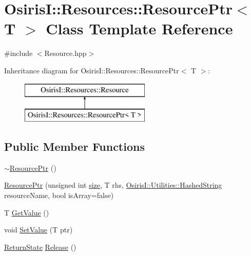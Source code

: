 \hypertarget{class_osiris_i_1_1_resources_1_1_resource_ptr}{\section{Osiris\-I\-:\-:Resources\-:\-:Resource\-Ptr$<$ T $>$ Class Template Reference}
\label{class_osiris_i_1_1_resources_1_1_resource_ptr}
}


{\ttfamily \#include $<$Resource.\-hpp$>$}

Inheritance diagram for Osiris\-I\-:\-:Resources\-:\-:Resource\-Ptr$<$ T $>$\-:\begin{figure}[H]
\begin{center}
\leavevmode
\includegraphics[height=2.000000cm]{class_osiris_i_1_1_resources_1_1_resource_ptr}
\end{center}
\end{figure}
\subsection*{Public Member Functions}
\begin{DoxyCompactItemize}
\item 
\hyperlink{class_osiris_i_1_1_resources_1_1_resource_ptr_ad8862e675581e87ccb0a69a496f26bdd}{$\sim$\-Resource\-Ptr} ()
\item 
\hyperlink{class_osiris_i_1_1_resources_1_1_resource_ptr_a82ae9200de93282bf1035d49bd0c77c9}{Resource\-Ptr} (unsigned int \hyperlink{class_osiris_i_1_1_resources_1_1_resource_a9c11fd6cff9340335e6c6a34c0651872}{size}, T rhs, \hyperlink{class_osiris_i_1_1_utilities_1_1_hashed_string}{Osiris\-I\-::\-Utilities\-::\-Hashed\-String} resource\-Name, bool is\-Array=false)
\item 
T \hyperlink{class_osiris_i_1_1_resources_1_1_resource_ptr_ac0591d024432525518ec74b9df7c2e48}{Get\-Value} ()
\item 
void \hyperlink{class_osiris_i_1_1_resources_1_1_resource_ptr_a153ccb92889867bc476eb44cbe6aa4c1}{Set\-Value} (T ptr)
\item 
\hyperlink{namespace_osiris_i_a8f53bf938dc75c65c6a529694514013e}{Return\-State} \hyperlink{class_osiris_i_1_1_resources_1_1_resource_ptr_ad3e87b7a1657d6068e013064b614089b}{Release} ()
\end{DoxyCompactItemize}
